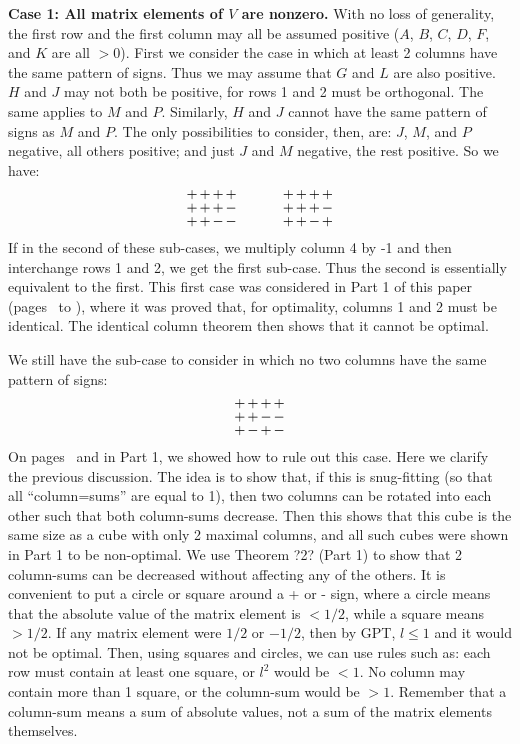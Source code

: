 {\bf Case 1: All matrix elements of $V$ are nonzero.}
\label{refpage13start}
With no loss of generality,
the first row and the first column may all be assumed positive ($A$, $B$,
$C$, $D$, $F$, and $K$ are all $> 0$).  First we consider the
case in which at least 2 columns have the same pattern of signs. Thus we
may assume that $G$ and $L$ are also positive. $H$ and $J$ may not both be
positive, for rows 1 and 2 must be orthogonal. The same applies to $M$ and
$P$. Similarly, $H$ and $J$ cannot have the same pattern of signs as $M$ and
$P$.  The only possibilities to consider, then, are: $J$, $M$, and $P$
negative, all others positive; and just $J$ and $M$ negative, the rest positive.
So we have:
\begin{equation*}
\myarrset
\begin{array}{ccccccccc}
+ & + & + & + & ~~~~~~~~~ & + & + & + & + \\
+ & + & + & - & ~~~~~~~~~ & + & + & + & - \\
+ & + & - & - & ~~~~~~~~~ & + & + & - & +
\end{array}
\end{equation*}
If in the second of these sub-cases, we multiply column 4 by -1 and then
interchange rows 1 and 2, we get the first sub-case.  Thus the second is
essentially equivalent to the first.  This first case was considered in Part 1
of this paper (pages~\pageref{refpage1start} to \pageref{refpage1end}), where
it was proved that, for optimality, columns 1 and 2 must be identical.  The
\label{refpage13end}
identical column theorem then shows that it cannot be optimal.

We still have the sub-case to consider in which no two columns have the same
\label{refpage14}
pattern of signs:
\begin{equation*}
\myarrset
\begin{array}{cccc}
+ & + & + & + \\
+ & + & - & - \\
+ & - & + & -
\end{array}
\end{equation*}
On pages~\pageref{refpage2start} and \pageref{refpage2end} in Part 1, we
showed how to rule out this case.  Here we
clarify the previous discussion.  The idea is to show that, if this is
snug-fitting (so that all ``column=sums''  are equal to 1), then two columns
can be rotated into each other such that both column-sums decrease.  Then
this shows that this cube is the same size as a cube with only 2 maximal
columns, and all such cubes were shown in Part 1 to be non-optimal.  We
use Theorem ?2? (Part 1) to show that 2 column-sums can be decreased
without affecting any of the others. It is convenient to put a circle or
square around a + or - sign, where a circle means that the absolute value
of the matrix element is $< 1/2$, while a square means $> 1/2$. If any matrix
element were $1/2$ or $-1/2$, then by GPT, $l \leq 1$ and it would not be
optimal.  Then, using squares and circles, we can use rules such as: each row
must contain at least one square, or $l^2$ would be $< 1$. No column may
contain more than 1 square, or the column-sum would be $> 1$. Remember that a
column-sum means a sum of absolute values, not a sum of the matrix
elements themselves.


